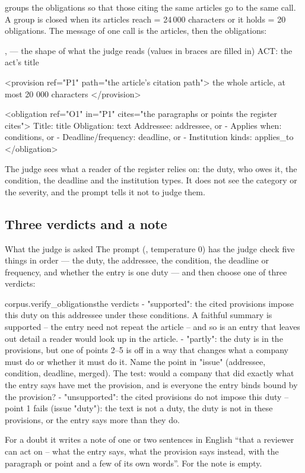  groups the obligations so that those citing the same articles go to the same
call. A group is closed when its articles reach  = 24\,000 characters or
it holds  = 20 obligations. The message of one call is the
articles, then the obligations:

\begin{codefile}{,  --- the shape of what the judge reads (values in braces are filled in)}
ACT: {the act's title}

<provision ref="P1" path="{the article's citation path}">
{the whole article, at most 20 000 characters}
</provision>

<obligation ref="O1" in="P1" cites="{the paragraphs or points the register cites}">
Title: {title}
Obligation: {text}
Addressee: {addressee, or -}
Applies when: {conditions, or -}
Deadline/frequency: {deadline, or -}
Institution kinds: {applies_to}
</obligation>
\end{codefile}

The judge sees what a reader of the register relies on: the duty, who owes it, the condition,
the deadline and the institution types. It does not see the category or the severity, and
the prompt tells it not to judge them.

\subsection{Three verdicts and a note}

\begin{aibox}{What the judge is asked}
The prompt (, temperature 0) has the judge check five
things in order --- the duty, the addressee, the condition, the deadline or frequency, and
whether the entry is one duty --- and then choose one of three verdicts:

\begin{promptexcerpt}{corpus.verify_obligations}{the verdicts}
- "supported": the cited provisions impose this duty on this addressee under these conditions. A faithful summary is supported – the entry need not repeat the article – and so is an entry that leaves out detail a reader would look up in the article.
- "partly": the duty is in the provisions, but one of points 2–5 is off in a way that changes what a company must do or whether it must do it. Name the point in "issue" (addressee, condition, deadline, merged). The test: would a company that did exactly what the entry says have met the provision, and is everyone the entry binds bound by the provision?
- "unsupported": the cited provisions do not impose this duty – point 1 fails (issue "duty"): the text is not a duty, the duty is not in these provisions, or the entry says more than they do.
\end{promptexcerpt}

For a doubt it writes a note of one or two sentences in English \enquote{that a reviewer can
act on – what the entry says, what the provision says instead, with the paragraph or point
and a few of its own words}. For  the note is empty.
\end{aibox}

